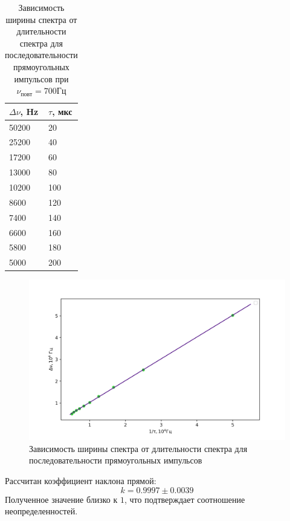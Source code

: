 \documentclass[a4paper,12pt]{article} %
\begin{document}
\begin{table}[h!]
\caption{Зависимость ширины спектра от длительности спектра для последовательности прямоугольных импульсов при $\nu_{повт} = 700 Гц$} \label{dnu(tau)_tbl}
\begin{tabular}{|l|l|}
\hline
$\Delta\nu$, Hz & $\tau$, мкс \\ \hline
50200         & 20       \\ \hline
25200         & 40       \\ \hline
17200         & 60       \\ \hline
13000         & 80       \\ \hline
10200         & 100      \\ \hline
8600          & 120      \\ \hline
7400          & 140      \\ \hline
6600          & 160      \\ \hline
5800          & 180      \\ \hline
5000          & 200      \\ \hline
\end{tabular}
\end{table}

\begin{figure}[h!]
\begin{center}
\includegraphics[width=\textwidth]{dnu(tau)}
\caption{Зависимость ширины спектра от длительности спектра для последовательности прямоугольных импульсов} \label{dnu(tau)_img}
\end{center}
\end{figure}
Рассчитан коэффициент наклона прямой:
\begin{equation}
k = 0.9997 \pm 0.0039
\end{equation}
Полученное значение близко к $1$, что подтверждает соотношение неопределенностей. 
\end{document}
